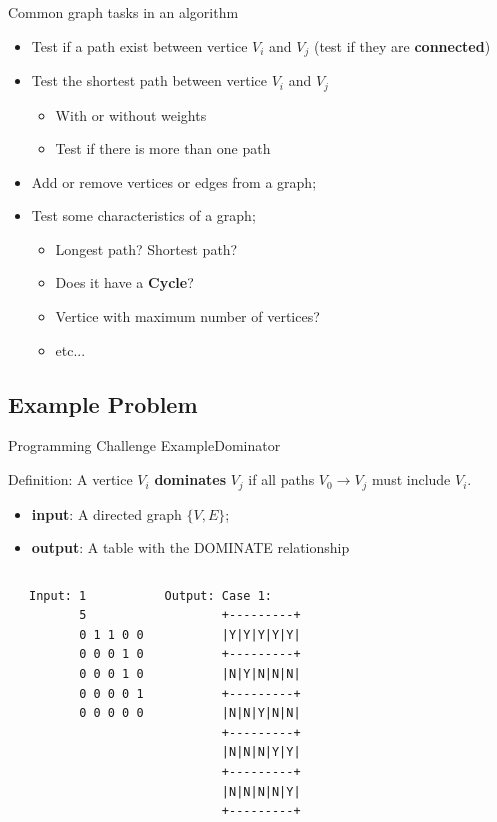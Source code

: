 \begin{frame}{Common graph tasks in an algorithm}
  \begin{itemize}
    \item Test if a path exist between vertice $V_i$ and $V_j$ (test if they are {\bf connected})
    \item Test the shortest path between vertice $V_i$ and $V_j$
    \begin{itemize}
      \item With or without weights
      \item Test if there is more than one path
    \end{itemize}
    \item Add or remove vertices or edges from a graph;
    \item Test some characteristics of a graph;
    \begin{itemize}
      \item Longest path? Shortest path?
      \item Does it have a {\bf Cycle}?
      \item Vertice with maximum number of vertices?
      \item etc...
    \end{itemize}
  \end{itemize}
\end{frame}

\subsection{Example Problem}

\begin{frame}[fragile]{Programming Challenge Example}{Dominator}
  \begin{block}{}
    Definition: A vertice $V_i$ {\bf dominates} $V_j$ if all paths $V_0 \to V_j$ must include $V_i$.
    \begin{itemize}
      \item {\bf input}: A directed graph $\{V,E\}$;
      \item {\bf output}: A table with the DOMINATE relationship
    \end{itemize}
  \end{block}
\begin{columns}[T]
    \begin{center}
      
    \end{center}
\begin{verbatim}
Input: 1
       5
       0 1 1 0 0
       0 0 0 1 0
       0 0 0 1 0
       0 0 0 0 1
       0 0 0 0 0
\end{verbatim}
{\smaller
\begin{verbatim}
Output: Case 1:
        +---------+
        |Y|Y|Y|Y|Y|
        +---------+
        |N|Y|N|N|N|
        +---------+
        |N|N|Y|N|N|
        +---------+
        |N|N|N|Y|Y|
        +---------+
        |N|N|N|N|Y|
        +---------+
\end{verbatim}}
  \end{columns}
\end{frame}

